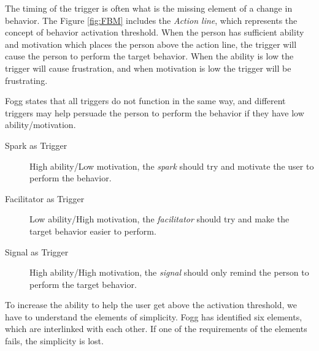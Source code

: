 The timing of the trigger is often what is the missing element of a change in behavior. The Figure \ref{fig:FBM} includes the \textit{Action line}, which represents the concept of behavior activation threshold. When the person has sufficient ability and motivation which places the person above the action line, the trigger will cause the person to perform the target behavior. When the ability is low the trigger will cause frustration, and when motivation is low the trigger will be frustrating.

Fogg states that all triggers do not function in the same way, and different triggers may help persuade the person to perform the behavior if they have low ability/motivation.

\begin{description}
  \item[Spark as Trigger] High ability/Low motivation, the \textit{spark} should try and motivate the user to perform the behavior.
  \item[Facilitator as Trigger] Low ability/High motivation, the \textit{facilitator} should try and make the target behavior easier to perform.
  \item[Signal as Trigger]  High ability/High motivation, the \textit{signal} should only remind the person to perform the target behavior.
\end{description}

To increase the ability to help the user get above the activation threshold, we have to understand the elements of simplicity. Fogg has identified six elements, which are interlinked with each other. If one of the requirements of the elements fails, the simplicity is lost.

